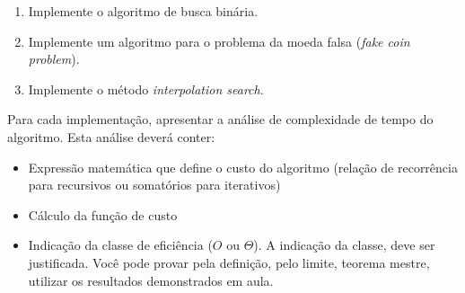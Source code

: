 \documentclass{article}
\begin{document}
\begin{enumerate}
    \item Implemente o algoritmo de busca binária.
    \item Implemente um algoritmo para o problema da moeda falsa (\textit{fake coin problem}).
    \item Implemente o método \textit{interpolation search}.
\end{enumerate}

Para cada implementação, apresentar a análise de complexidade de tempo do algoritmo. Esta análise deverá conter:

\begin{itemize}
    \item Expressão matemática que define o custo do algoritmo (relação de recorrência para recursivos ou somatórios para iterativos) 
    \item Cálculo da função de custo
    \item Indicação da classe de eficiência ($O$ ou $\Theta$). A indicação da classe, deve ser justificada. Você pode provar pela definição, pelo limite, teorema mestre, utilizar os resultados demonstrados em aula.
\end{itemize}


%
%
\end{document}
